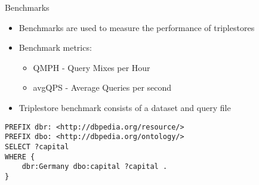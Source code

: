 \begin{frame}[fragile]{Benchmarks}
	
	\begin{itemize}
		\item Benchmarks are used to measure the performance of triplestores
		
		\item Benchmark metrics:
		\begin{itemize}
			\item QMPH - Query Mixes per Hour
			\item avgQPS - Average Queries per second
		\end{itemize}
	
		\item Triplestore benchmark consists of a dataset and query file
	\end{itemize}
	
	\begin{block}{}
		\begin{lstlisting}
PREFIX dbr: <http://dbpedia.org/resource/>
PREFIX dbo: <http://dbpedia.org/ontology/>
SELECT ?capital
WHERE {
	dbr:Germany dbo:capital ?capital .
}
		\end{lstlisting}
	\end{block}
\end{frame}
